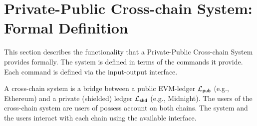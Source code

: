 \section{Private-Public Cross-chain \Payment{} System: Formal Definition}
\label{sec:definition}
This section describes the functionality that  a Private-Public Cross-chain \Payment{}  System provides formally. The system is defined in terms of the commands it provide. Each command is defined via the input-output interface.


A cross-chain \payment{} system is a bridge between a public  EVM-ledger  $\mathcal{L}_{\mathsf{pub}}$ (e.g., Ethereum) and a private (shielded) ledger $\mathcal{L}_{\mathsf{shd}}$ (e.g., Midnight). The users of the cross-chain system are users of possess account on both chains. The system and the users interact with each chain using the available interface.


